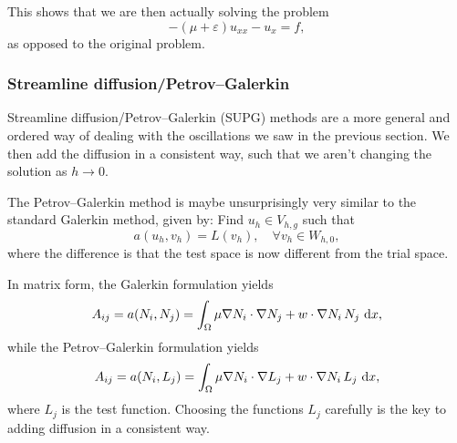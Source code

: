 This shows that we are then actually solving the problem
\begin{equation}
    -(\mu + \varepsilon) u_{xx} - u_x = f,
\end{equation}
as opposed to the original problem.

\subsubsection{Streamline diffusion/Petrov--Galerkin} %
Streamline diffusion/Petrov--Galerkin (SUPG) methods are a more general and ordered way of dealing with the oscillations we saw in the previous section. %
We then add the diffusion in a consistent way, such that we aren't changing the solution as $h \to 0$.

The Petrov--Galerkin method is maybe unsurprisingly very similar to the standard Galerkin method, given by: %
Find $u_h \in V_{h,g}$ such that
\begin{equation}
    a(u_h, v_h) = L(v_h), \quad \forall v_h \in W_{h, 0},
\end{equation}
where the difference is that the test space is now different from the trial space.

In matrix form, the Galerkin formulation yields
\begin{equation}
    A_{ij} = a(N_i, N_j) = \int_{\Omega} \mu \nabla N_i \cdot \nabla N_j + w \cdot \nabla N_i \, N_j \, \mathop{}\!\mathrm{d} x,
\end{equation}
while the Petrov--Galerkin formulation yields %
\begin{equation}
    A_{ij} = a(N_i, L_j) = \int_{\Omega} \mu \nabla N_i \cdot \nabla L_j + w \cdot \nabla N_i \, L_j \, \mathop{}\!\mathrm{d} x,
\end{equation}
where $L_j$ is the test function.
Choosing the functions $L_j$ carefully is the key to adding diffusion in a consistent way.

